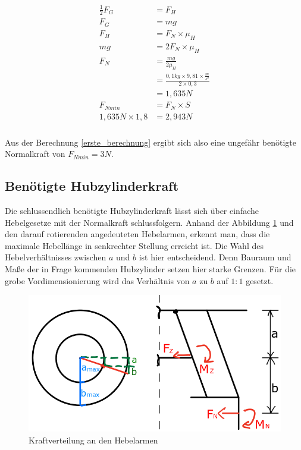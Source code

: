 \begin{eqnarray}
\label{erste_berechnung}
\begin{split}
\frac{1}{2}F_G &= F_H  \\
F_G &= mg \\
F_H &= F_N \times \mu_H \\
mg &= 2 F_N \times \mu_H \\
F_N &= \frac{mg}{2\mu_H} \\
	&= \frac{0,1kg\times9,81\times\frac{m}{s^2}}{2\times 0,3} \\
	&= 1,635N \\
F_{Nmin} &= F_N\times S \\
1,635N\times 1,8 &= 2,943N \\
\end{split}
\end{eqnarray}

Aus der Berechnung \eqref{erste_berechnung} ergibt sich also eine ungefähr benötigte Normalkraft von $F_{Nmin} = 3N$.

\subsection{Benötigte Hubzylinderkraft}

Die schlussendlich benötigte Hubzylinderkraft lässt sich über einfache Hebelgesetze mit der Normalkraft schlussfolgern. Anhand der Abbildung \ref{mechanikskizze} und den darauf rotierenden angedeuteten Hebelarmen, erkennt man, dass die maximale Hebellänge in senkrechter Stellung erreicht ist. Die Wahl des Hebelverhältnisses zwischen $a$ und $b$ ist hier entscheidend. Denn Bauraum und Maße der in Frage kommenden Hubzylinder setzen hier starke Grenzen. Für die grobe Vordimensionierung wird das Verhältnis von $a$ zu $b$ auf $1:1$ gesetzt.

\begin{figure}[h]
	\begin{center}
	\includegraphics[scale=0.5]{"Grafiken/Mechanikskizze.png"}
	\caption{Kraftverteilung an den Hebelarmen}
	\label{mechanikskizze}
	\end{center}
\end{figure}

